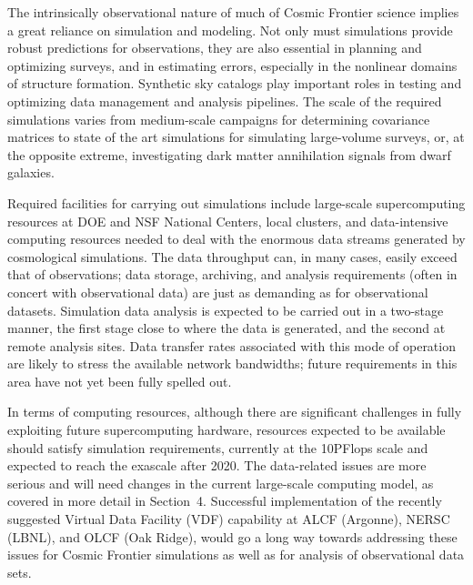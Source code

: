 \medskip


The intrinsically observational nature of much of Cosmic Frontier
science implies a great reliance on simulation and modeling. Not only
must simulations provide robust predictions for observations, they are
also essential in planning and optimizing surveys, and in estimating
errors, especially in the nonlinear domains of structure
formation. Synthetic sky catalogs play important roles in testing and
optimizing data management and analysis pipelines. The scale of the
required simulations varies from medium-scale campaigns for
determining covariance matrices to state of the art simulations for
simulating large-volume surveys, or, at the opposite extreme,
investigating dark matter annihilation signals from dwarf galaxies.

Required facilities for carrying out simulations include large-scale
supercomputing resources at DOE and NSF National Centers, local
clusters, and data-intensive computing resources needed to deal with
the enormous data streams generated by cosmological simulations. The
data throughput can, in many cases, easily exceed that of
observations; data storage, archiving, and analysis requirements
(often in concert with observational data) are just as demanding as
for observational datasets. Simulation data analysis is expected to be
carried out in a two-stage manner, the first stage close to where the
data is generated, and the second at remote analysis sites. Data
transfer rates associated with this mode of operation are likely to
stress the available network bandwidths; future requirements in this
area have not yet been fully spelled out.

In terms of computing resources, although there are significant
challenges in fully exploiting future supercomputing hardware,
resources expected to be available should satisfy simulation
requirements, currently at the 10PFlops scale and expected to reach
the exascale after 2020. The data-related issues are more serious and
will need changes in the current large-scale computing model, as
covered in more detail in Section~4. Successful implementation of the
recently suggested Virtual Data Facility (VDF) capability at ALCF
(Argonne), NERSC (LBNL), and OLCF (Oak Ridge), would go a long way
towards addressing these issues for Cosmic Frontier simulations as
well as for analysis of observational data sets.

\medskip

